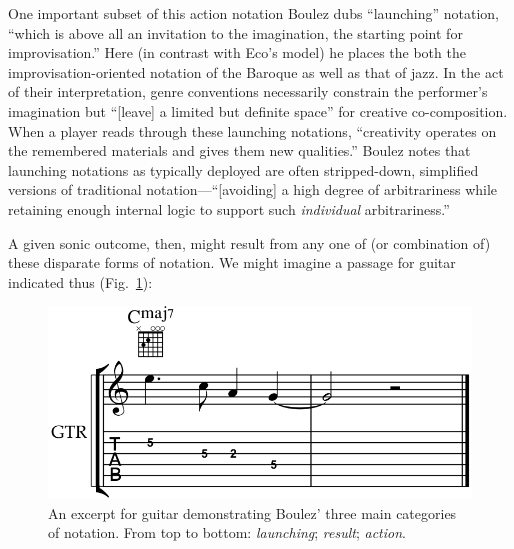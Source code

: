     One important subset of this action notation Boulez dubs ``launching'' notation, ``which is above all an invitation to the imagination, the starting point for improvisation.'' Here (in contrast with Eco's model) he places the both the improvisation-oriented notation of the Baroque as well as that of jazz. In the act of their interpretation, genre conventions necessarily constrain the performer's imagination but ``[leave] a limited but definite space'' for creative co-composition. When a player reads through these launching notations, ``creativity operates on the remembered materials and gives them new qualities.'' Boulez notes that launching notations as typically deployed are often stripped-down, simplified versions of traditional notation---``[avoiding] a high degree of arbitrariness while retaining enough internal logic to support such \textit{individual} arbitrariness.''\autocite[530]{Boulez_Nattiez_2019} 

    A given sonic outcome, then, might result from any one of (or combination of) these disparate forms of notation. We might imagine a passage for guitar indicated thus (Fig.~\ref{fig:guitarnotation}):

            \begin{figure} 
            \centering
            \includegraphics[width=.6\textwidth]{images/chapter2/guitarnotation.png}
            \captionsetup{width=.5\textwidth}
            \caption{An excerpt for guitar demonstrating Boulez' three main categories of notation. From top to bottom: \textit{launching}; \textit{result}; \textit{action}.}
            \label{fig:guitarnotation}
        \end{figure}


